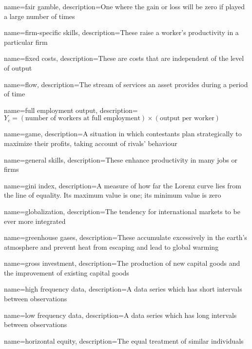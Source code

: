 {
	name={fair gamble},
	description={One where the gain or loss will be zero if played a large number of times}
}

{
	name={firm-specific skills},
	description={These raise a worker's productivity in a particular firm}
}

{
	name={fixed costs},
	description={These are costs that are independent of the level of output}
}

{
	name=flow,
	description={The stream of services an asset provides during a period of time}
}

{
	name={full employment output},
	description={$Y_c=(\text{number of workers at full employment})\times (\text{output per worker})$}
}

{
	name=game,
	description={A situation in which contestants plan strategically to maximize their profits, taking account of rivals' behaviour}
}

{
	name={general skills},
	description={These enhance productivity in many jobs or firms}
}

{
	name={gini index},
	description={A measure of how far the Lorenz curve lies from the line of equality. Its maximum value is one; its minimum value is zero}
}

{
	name=globalization,
	description={The tendency for international markets to be ever more integrated}
}

{
	name={greenhouse gases},
	description={These accumulate excessively in the earth's atmosphere and prevent heat from escaping and lead to global warming}
}

{
	name={gross investment},
	description={The production of new capital goods and the improvement of existing capital goods}
}

{
	name={high frequency data},
	description={A data series which has short intervals between observations}
}

{
	name={low frequency data},
	description={A data series which has long intervals between observations}
}

{
	name={horizontal equity},
	description={The equal treatment of similar individuals}
}

